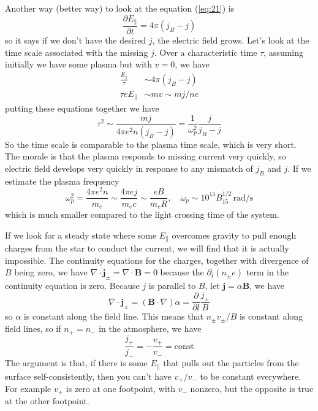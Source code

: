 \documentclass[letterpaper, 11pt]{article}
\numberwithin{equation}{section}
\numberwithin{figure}{section}
\begin{document}
Another way (better way) to look at the equation (\ref{eq:21}) is
\begin{equation}
    \label{eq:22}
    \frac{\partial E_{\parallel}}{\partial t} = 4\pi(j_B - j)
\end{equation}
so it says if we don't have the desired $j$, the electric field grows. Let's look at the time scale associated with the missing $j$. Over a characteristic time $\tau$, assuming initially we have some plasma but with $v = 0$, we have
\begin{align}
  \frac{E_{\parallel}}{\tau} &\sim 4\pi (j_B - j) \\
  \tau e E_{\parallel} &\sim mv \sim mj/ne
\end{align}
putting these equations together we have
\begin{equation}
    \label{eq:23}
    \tau^2 \sim \frac{m j}{4\pi e^2n(j_B - j)} = \frac{1}{\omega_p^2}\frac{j}{j_B - j}
\end{equation}
So the time scale is comparable to the plasma time scale, which is very short. The morale is that the plasma responds to missing current very quickly, so electric field develops very quickly in response to any mismatch of $j_{B}$ and $j$. If we estimate the plasma frequency
\begin{equation}
    \label{eq:24}
    \omega_p^2 = \frac{4\pi e^2n}{m_e} \sim \frac{4\pi e j}{m_ec} \sim \frac{eB}{m_eR}, \quad \omega_{p} \sim 10^{13}B_{15}^{1/2}\,\mathrm{rad/s}
\end{equation}
which is much smaller compared to the light crossing time of the system.

If we look for a steady state where some $E_{\parallel}$ overcomes gravity to pull enough charges from the star to conduct the current, we will find that it is actually impossible. The continuity equations for the charges, together with divergence of $B$ being zero, we have $\nabla\cdot \boldsymbol{j}_{\pm} = \nabla\cdot \boldsymbol{B} = 0$ because the $\partial_t(n_{\pm}e)$ term in the continuity equation is zero. Because $j$ is parallel to $B$, let $\boldsymbol{j} = \alpha \boldsymbol{B}$, we have
\begin{equation}
    \label{eq:25}
    \nabla\cdot \boldsymbol{j}_{\pm} = (\boldsymbol{B}\cdot\nabla)\alpha = \frac{\partial}{\partial l}\frac{j_{\pm}}{B}
\end{equation}
so $\alpha$ is constant along the field line. This means that $n_{\pm}v_{\pm}/B$ is constant along field lines, so if $n_+ = n_-$ in the atmosphere, we have
\begin{equation}
    \label{eq:26}
    \frac{j_+}{j_-} = -\frac{v_+}{v_-} = \mathrm{const}
\end{equation}
The argument is that, if there is some $E_{\parallel}$ that pulls out the particles from the surface self-consistently, then you can't have $v_+/v_-$ to be constant everywhere. For example $v_+$ is zero at one footpoint, with $v_-$ nonzero, but the opposite is true at the other footpoint.
\end{document}
